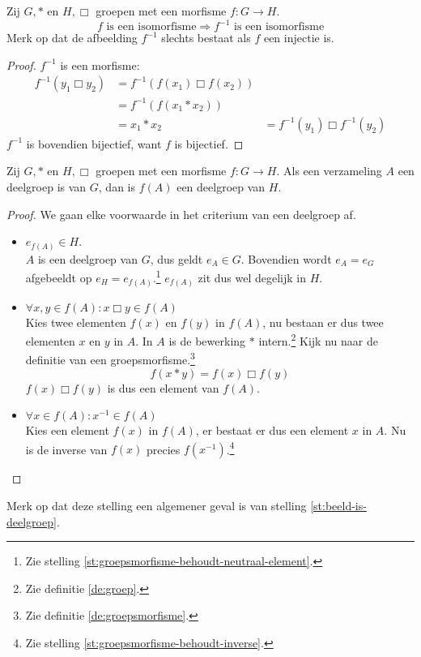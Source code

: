 \documentclass[main.tex]{subfiles}
\begin{document}
\begin{st}
  Zij $G,*$ en $H,\Box$ groepen met een morfisme $f: G \rightarrow H$.
  \[ f \text{ is een isomorfisme} \Rightarrow f^{-1} \text{ is een isomorfisme} \]
  Merk op dat de afbeelding $f^{-1}$ slechts bestaat als $f$ een injectie is.
  \begin{proof}
    $f^{-1}$ is een morfisme:
    \[ 
    \begin{array}{rll}
      f^{-1}(y_{1} \Box y_{2}) &= f^{-1}(f(x_{1}) \Box f(x_{2})) &\\
                             &= f^{-1}(f(x_{1} * x_{2})) &\\
                             &= x_{1} * x_{2} &= f^{-1}(y_{1}) \Box f^{-1}(y_{2})
    \end{array}
    \]
    $f^{-1}$ is bovendien bijectief, want $f$ is bijectief.
  \end{proof}
\end{st}

\begin{st}
  \label{st:fa-deelgroep-h}
  Zij $G,*$ en $H,\Box$ groepen met een morfisme $f: G \rightarrow H$.
  Als een verzameling $A$ een deelgroep is van $G$, dan is $f(A)$ een deelgroep van $H$.

  \begin{proof}
    We gaan elke voorwaarde in het criterium van een deelgroep af.
    \begin{itemize}
    \item $e_{f(A)} \in H$.\\
      $A$ is een deelgroep van $G$, dus geldt $e_{A}\in G$.
      Bovendien wordt $e_{A} = e_{G}$ afgebeeldt op $e_{H} = e_{f(A)}$.\footnote{Zie stelling \ref{st:groepsmorfisme-behoudt-neutraal-element}.}
      $e_{f(A)}$ zit dus wel degelijk in $H$.
    \item $\forall x,y \in f(A): x \Box y \in f(A)$\\
      Kies twee elementen $f(x)$ en $f(y)$ in $f(A)$, nu bestaan er dus twee elementen $x$ en $y$ in $A$.
      In $A$ is de bewerking $*$ intern.\footnote{Zie definitie \ref{de:groep}.}
      Kijk nu naar de definitie van een groepsmorfisme.\footnote{Zie definitie \ref{de:groepsmorfisme}.}
      \[ f(x * y) = f(x) \Box f(y) \]
      $f(x) \Box f(y)$ is dus een element van $f(A)$.
    \item $\forall x \in f(A): x^{-1} \in f(A)$\\
      Kies een element $f(x)$ in $f(A)$, er bestaat er dus een element $x$ in $A$.
      Nu is de inverse van $f(x)$ precies $f(x^{-1})$.\footnote{Zie stelling \ref{st:groepsmorfisme-behoudt-inverse}.}
    \end{itemize}
  \end{proof}
  Merk op dat deze stelling een algemener geval is van stelling \ref{st:beeld-is-deelgroep}.
\end{st}
\end{document}
